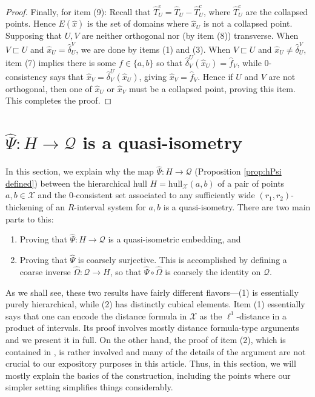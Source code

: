 \documentclass{amsart}
\theoremstyle{definition}
\theoremstyle{remark}
\theoremstyle{definition}
\newcommand{\calQ}{\mathcal{Q}}
\newcommand{\calX}{\mathcal{X}}
\newcommand{\hT}{\widehat{T}}
\newcommand{\hx}{\hat{x}}
\newcommand{\hd}{\hat{\delta}}
\newcommand{\hO}{\widehat{\Omega}}
\newcommand{\hPsi}{\widehat{\Psi}}
\newcommand{\hf}{\hat{f}}
\newcommand{\hull}{\mathrm{hull}}
\newcommand{\nest}{\sqsubset}
\begin{document}
\begin{proof}
Finally, for item (9): Recall that $\hT^e_U = \hT_U - \hT^c_U$, where $\hT^c_U$ are the collapsed points.  Hence $E(\hx)$ is the set of domains where $\hx_U$ is not a collapsed point.  Supposing that $U,V$ are neither orthogonal nor (by item (8)) transverse.  When $V \nest U$ and $\hx_U = \hd^V_U$, we are done by items (1) and (3).  When $V \nest U$ and $\hx_U \neq \hd^V_U$, item (7) implies there is some $f \in \{a,b\}$ so that $\hd^U_V(\hx_U) = \hf_V$, while $0$-consistency says that $\hx_V = \hd^U_V(\hx_U)$, giving $\hx_V = \hf_V$.  Hence if $U$ and $V$ are not orthogonal, then one of $\hx_U$ or $\hx_V$ must be a collapsed point, proving this item.  This completes the proof.



\end{proof}














\section{$\hPsi:H \to \calQ$ is a quasi-isometry} \label{sec:hPsi qi}

In this section, we explain why the map $\hPsi:H \to \calQ$ (Proposition \ref{prop:hPsi defined}) between the hierarchical hull $H = \hull_{\calX}(a,b)$ of a pair of points $a,b \in \calX$ and the $0$-consistent set associated to any sufficiently wide $(r_1,r_2)$-thickening of an $R$-interval system for $a,b$ is a quasi-isometry.  There are two main parts to this:

\begin{enumerate}
\item Proving that $\hPsi:H \to \calQ$ is a quasi-isometric embedding, and
\item Proving that $\hPsi$ is coarsely surjective.  This is accomplished by defining a coarse inverse $\hO:\calQ \to H$, so that $\hPsi \circ \hO$ is coarsely the identity on $\calQ$.
\end{enumerate}

As we shall see, these two results have fairly different flavors---(1) is essentially purely hierarchical, while (2) has distinctly cubical elements.  Item (1) essentially says that one can encode the distance formula in $\calX$ as the $\ell^1$-distance in a product of intervals.  Its proof involves mostly distance formula-type arguments and we present it in full.  On the other hand, the proof of item (2), which is contained in \cite[Sections 9--11]{Dur_infcube}, is rather involved and many of the details of the argument are not crucial to our expository purposes in this article.  Thus, in this section, we will mostly explain the basics of the construction, including the points where our simpler setting simplifies things considerably.
\end{document}
